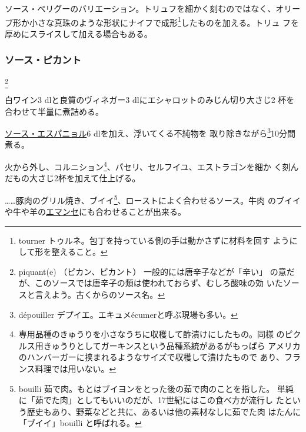 \begin{recette}

ソース・ペリグーのバリエーション。トリュフを細かく刻むのではなく、オリー
ブ形か小さな真珠のような形状にナイフで成形\footnote{tourner
  トゥルネ。包丁を持っている側の手は動かさずに材料を回す
  ようにして形を整えること。}したものを加える。トリュ
フを厚めにスライスして加える場合もある。

\hypertarget{sauce-piquante}{%
\subsubsection{ソース・ピカント}\label{sauce-piquante}}

\footnote{piquant(e) （ピカン、ピカント）
  一般的には唐辛子などが「辛い」
  の意だが、このソースでは唐辛子の類は使われておらず、むしろ酸味の効
  いたソースと言えよう。古くからのソース名。}


白ワイン3 dlと良質のヴィネガー3 dlにエシャロットのみじん切り大さじ2
\undemi{}杯を合わせて半量に煮詰める。

\protect\hyperlink{sauce-espagnole}{ソース・エスパニョル}6
dlを加え、浮いてくる不純物を 取り除きながら\footnote{dépouiller
  デプイエ。エキュメécumerと呼ぶ現場も多い。}10分間煮る。

火から外し、コルニション\footnote{専用品種のきゅうりを小さなうちに収穫して酢漬けにしたもの。同様
  のピクルス用きゅうりとしてガーキンスという品種系統があるがもっぱら
  アメリカのハンバーガーに挟まれるようなサイズで収穫して漬けたもので
  あり、フランス料理では用いない。}、パセリ、セルフイユ、エストラゴンを細か
く刻んだもの大さじ2杯を加えて仕上げる。

\ldots{}\ldots{}豚肉のグリル焼き、ブイイ\footnote{bouilli
  茹で肉。もとはブイヨンをとった後の茹で肉のことを指した。
  単純に「茹でた肉」としてもいいのだが、17世紀にはこの食べ方が流行し
  たという歴史もあり、野菜などと共に、あるいは他の素材なしに茹でた肉
  はたんに「ブイイ」bouilli と呼ばれる。}、ローストによく合わせるソース。牛肉
のブイイや牛や羊の\protect\hyperlink{}{エマンセ}にも合わせることが出来る。


\end{recette}
